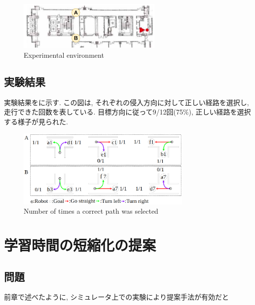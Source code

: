 \documentclass{jarticle}
\begin{document}
 \begin{figure}[h]
  \centering
   \includegraphics[width=70mm]{tsudanuma2.png}
   \vspace*{-4mm}
   \caption{Experimental environment}
   \label{fig: fig7}
 \end{figure}

\subsection{実験結果}
実験結果をに示す. この図は, それぞれの侵入方向に対して正しい経路を選択し, 走行できた回数を表している. 目標方向に従って9/12回(75\%), 正しい経路を選択する様子が見られた.

\begin{figure}[h]
  \centering
   \includegraphics[width=85mm]{60000step_real2.png}
   \vspace*{-4mm}
   \caption{Number of times a correct path was selected}
   \label{fig: fig8}
 \end{figure}

\section{学習時間の短縮化の提案}
\subsection{問題}
前章で述べたように, シミュレータ上での実験により提案手法が有効だと

\end{document}
